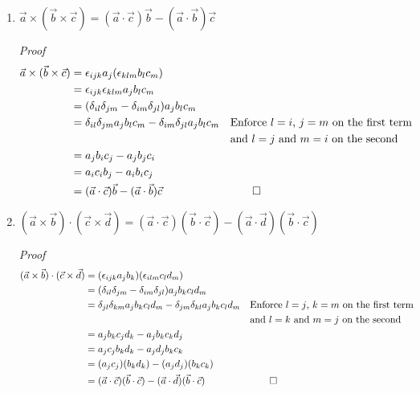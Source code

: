 \documentclass[11pt,twoside]{article}
\newcommand{\vect}[1]{\vec{#1}}
\newcommand{\cross}{\times}
\begin{document}
\begin{enumerate}
%
%
\item $\vect{a}\cross(\vect{b}\cross\vect{c}) = (\vect{a}\cdot\vect{c})\vect{b} - (\vect{a}\cdot\vect{b})\vect{c}$

\textit{Proof}
\begin{align*}
\vect{a}\cross(\vect{b}\cross\vect{c}) & = \epsilon_{ijk}a_j(\epsilon_{klm}b_lc_m)\\
                                       & = \epsilon_{ijk}\epsilon_{klm}a_jb_lc_m\\
                                       & = (\delta_{il}\delta_{jm}-\delta_{im}\delta_{jl})a_jb_lc_m\\
                                       & = \delta_{il}\delta_{jm}a_jb_lc_m-\delta_{im}\delta_{jl}a_jb_lc_m 
                                         && \text{Enforce $l=i$, $j=m$ on the first term}\\
                                       & && \text{and $l=j$ and $m=i$ on the second}\\
                                       & = a_jb_ic_j-a_jb_jc_i \\
                                       & = a_ic_ib_j-a_ib_ic_j \\
                                       & = (\vect{a}\cdot\vect{c})\vect{b} - (\vect{a}\cdot\vect{b})\vect{c} && \qed
\end{align*}



%
%
\item $(\vect{a}\cross\vect{b})\cdot(\vect{c}\cross\vect{d}) = (\vect{a}\cdot\vect{c})(\vect{b}\cdot{\vect{c}})-(\vect{a}\cdot\vect{d})(\vect{b}\cdot{\vect{c}})$

\textit{Proof} 
\begin{align*}
(\vect{a}\cross\vect{b})\cdot(\vect{c}\cross\vect{d}) 
            & = (\epsilon_{ijk}a_jb_k)(\epsilon_{ilm}c_ld_m)\\
            & = (\delta_{il}\delta_{jm}-\delta_{im}\delta_{jl})a_jb_kc_ld_m\\  
            & = \delta_{jl}\delta_{km}a_jb_kc_ld_m-\delta_{jm}\delta_{kl}a_jb_kc_ld_m
              && \text{Enforce $l=j$, $k=m$ on the first term}\\
            & && \text{and $l=k$ and $m=j$ on the second}\\
            & = a_jb_kc_jd_k-a_jb_kc_kd_j\\
            & = a_jc_jb_kd_k-a_jd_jb_kc_k\\
            & = (a_jc_j)(b_kd_k)-(a_jd_j)(b_kc_k)\\
            & = (\vect{a}\cdot\vect{c})(\vect{b}\cdot{\vect{c}})-(\vect{a}\cdot\vect{d})(\vect{b}\cdot{\vect{c}}) && \qed
\end{align*}


\end{enumerate}
\end{document}
